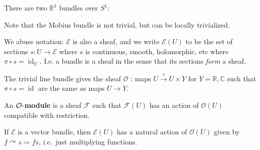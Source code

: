 \begin{example}

There are two \({\mathbb{R}}^1\) bundles over \(S^1\):

\begin{figure}
\centering
{}
\end{figure}

Note that the Mobius bundle is not trivial, but can be locally
trivialized.

\end{example}

\begin{remark}

We abuse notation: \(\mathcal{E}\) is also a sheaf, and we write
\(\mathcal{E}(U)\) to be the set of sections \(s: U\to \mathcal{E}\)
where \(s\) is continuous, smooth, holomorphic, etc where
\(\pi \circ s = \operatorname{id}_U\). I.e. a bundle is a sheaf in the
sense that its sections \emph{form} a sheaf.

\end{remark}

\begin{example}[?]

The trivial line bundle gives the sheaf \({\mathcal{O}}\) : maps
\(U \xrightarrow{s} U\times Y\) for \(Y={\mathbb{R}}, {\mathbb{C}}\)
such that \(\pi \circ s = \operatorname{id}\) are the same as maps
\(U\to Y\).

\end{example}

\begin{definition}

An \textbf{\({\mathcal{O}}{\hbox{-}}\)module} is a sheaf \(\mathcal{F}\)
such that \(\mathcal{F}(U)\) has an action of \(\mathcal{O}(U)\)
compatible with restriction.

\end{definition}

\begin{example}[?]

If \(\mathcal{E}\) is a vector bundle, then \(\mathcal{E}(U)\) has a
natural action of \({\mathcal{O}}(U)\) given by
\(f\curvearrowright s \coloneqq fs\), i.e.~just multiplying functions.

\end{example}

